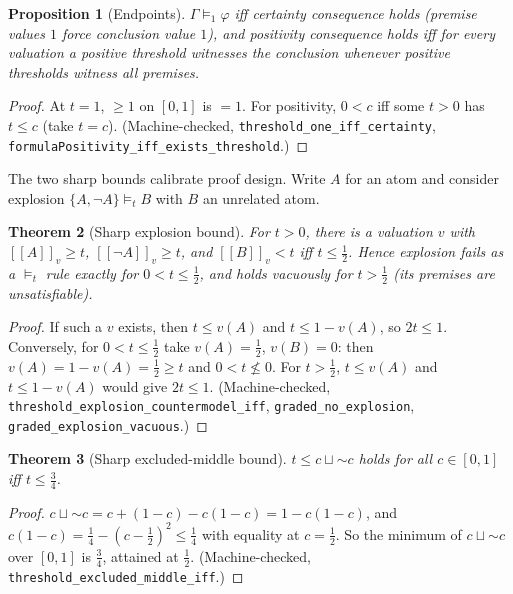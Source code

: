 \documentclass[11pt,a4paper]{article}
\newtheorem{theorem}{Theorem}[section]
\newtheorem{proposition}[theorem]{Proposition}
\newcommand{\negc}{\mathord{\sim}}
\newcommand{\disjc}{\sqcup}
\newcommand{\evalc}[2]{[\![ {#2} ]\!]_{#1}}
\begin{document}
\begin{proposition}[Endpoints]
\label{prop:threshold-endpoints}
$\Gamma \models_1 \varphi$ iff certainty consequence holds
(premise values $1$ force conclusion value $1$), and positivity
consequence holds iff for every valuation a positive threshold
witnesses the conclusion whenever positive thresholds witness all
premises.
\end{proposition}
\begin{proof}
At $t = 1$, $\geq 1$ on $[0,1]$ is $= 1$.
For positivity, $0 < c$ iff some $t > 0$ has $t \leq c$ (take
$t = c$).
(Machine-checked, \texttt{threshold\_one\_iff\_certainty},
\texttt{formulaPositivity\_iff\_exists\_threshold}.)
\end{proof}

The two sharp bounds calibrate proof design.
Write $A$ for an atom and consider explosion
$\{A, \neg A\} \models_t B$ with $B$ an unrelated atom.

\begin{theorem}[Sharp explosion bound]
\label{thm:explosion-sharp}
For $t > 0$, there is a valuation $v$ with
$\evalc{v}{A} \geq t$, $\evalc{v}{\neg A} \geq t$, and
$\evalc{v}{B} < t$
\emph{iff} $t \leq \tfrac12$.
Hence explosion fails as a $\models_t$ rule exactly for
$0 < t \leq \tfrac12$, and holds vacuously for $t > \tfrac12$
(its premises are unsatisfiable).
\end{theorem}
\begin{proof}
If such a $v$ exists, then $t \leq v(A)$ and $t \leq 1 - v(A)$, so
$2t \leq 1$.
Conversely, for $0 < t \leq \tfrac12$ take $v(A) = \tfrac12$,
$v(B) = 0$: then $v(A) = 1 - v(A) = \tfrac12 \geq t$ and
$0 < t \not\leq 0$.
For $t > \tfrac12$, $t \leq v(A)$ and $t \leq 1 - v(A)$ would give
$2t \leq 1$.
(Machine-checked, \texttt{threshold\_explosion\_countermodel\_iff},
\texttt{graded\_no\_explosion}, \texttt{graded\_explosion\_vacuous}.)
\end{proof}

\begin{theorem}[Sharp excluded-middle bound]
\label{thm:em-sharp}
$t \leq c \disjc \negc c$ holds for all $c \in [0,1]$ \emph{iff}
$t \leq \tfrac34$.
\end{theorem}
\begin{proof}
$c \disjc \negc c = c + (1-c) - c(1-c) = 1 - c(1-c)$, and
$c(1-c) = \tfrac14 - (c - \tfrac12)^2 \leq \tfrac14$ with equality at
$c = \tfrac12$.
So the minimum of $c \disjc \negc c$ over $[0,1]$ is $\tfrac34$,
attained at $\tfrac12$.
(Machine-checked, \texttt{threshold\_excluded\_middle\_iff}.)
\end{proof}
\end{document}
